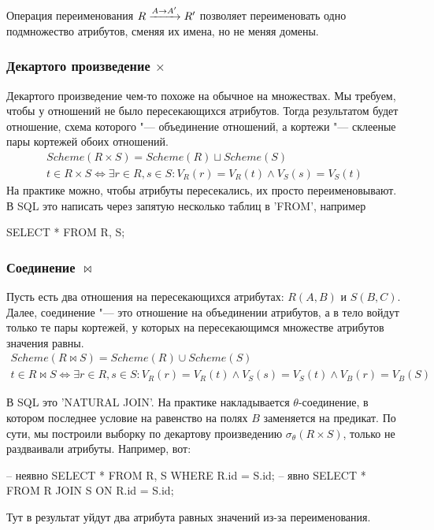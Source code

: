 Операция переименования $R \xrightarrow{A \rightarrow A'} R'$ позволяет переименовать одно подмножество атрибутов, сменяя их имена, но не меняя домены.

\subsubsection{Декартого произведение \texorpdfstring{$×$}{×}}

Декартого произведение чем-то похоже на обычное на множествах.
Мы требуем, чтобы у отношений не было пересекающихся атрибутов.
Тогда результатом будет отношение, схема которого "--- объединение отношений, а кортежи "--- склееные пары кортежей обоих отношений.
\begin{gather*}
	Scheme(R × S) = Scheme(R) ⊔ Scheme(S) \\
	t ∈ R × S ⇔ ∃ r ∈ R, s ∈ S\colon V_R(r) = V_R(t) ∧ V_S(s) = V_S(t)
\end{gather*}
На практике можно, чтобы атрибуты пересекались, их просто переименовывают.
В SQL это написать через запятую несколько таблиц в \sql'FROM', например
\begin{sqlcode}
SELECT * FROM R, S;
\end{sqlcode}

\subsubsection{Соединение \texorpdfstring{$⋈ $}{$⋈ $}}

Пусть есть два отношения на пересекающихся атрибутах:
$R(A, B)$ и $S(B, C)$.
Далее, соединение "--- это отношение на объединении атрибутов,
а в тело войдут только те пары кортежей, у которых на пересекающимся множестве атрибутов значения равны.
\begin{gather*}
	Scheme(R ⋈ S) = Scheme(R) ∪ Scheme(S) \\
	t ∈ R ⋈ S ⇔ ∃ r ∈ R, s ∈ S\colon V_R(r) = V_R(t) ∧ V_S(s) = V_S(t)
		∧ V_B(r) = V_B(S)
\end{gather*}

В SQL это \sql'NATURAL JOIN'.
На практике накладывается $θ$-соединение, в котором последнее условие на равенство на полях $B$ заменяется на предикат.
По сути, мы построили выборку по декартову произведению $σ_θ(R × S)$, только не раздваивали атрибуты.
Например, вот:
\begin{sqlcode}
-- неявно
SELECT *
	FROM R, S
	WHERE R.id = S.id;
-- явно
SELECT *
	FROM R
	JOIN S ON R.id = S.id;
\end{sqlcode}
Тут в результат уйдут два атрибута равных значений из-за переименования.

